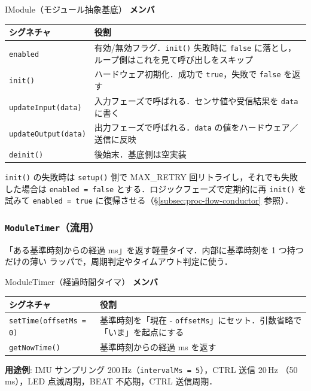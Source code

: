\documentclass[lualatex,book,paper=a4paper,jafontsize=11.5pt,jafontscale=1.05]{jlreq}
\begin{document}
\begin{apibox}{IModule（モジュール抽象基底）}
\textbf{メンバ}\\[2pt]
\begin{tabular}{l p{}}
\toprule
\textbf{シグネチャ} & \textbf{役割} \\
\midrule
\texttt{enabled}              & 有効/無効フラグ．\texttt{init()} 失敗時に \texttt{false} に落とし，ループ側はこれを見て呼び出しをスキップ \\
\texttt{init()}               & ハードウェア初期化．成功で \texttt{true}，失敗で \texttt{false} を返す \\
\texttt{updateInput(data)}    & 入力フェーズで呼ばれる．センサ値や受信結果を \texttt{data} に書く \\
\texttt{updateOutput(data)}   & 出力フェーズで呼ばれる．\texttt{data} の値をハードウェア／送信に反映 \\
\texttt{deinit()}             & 後始末．基底側は空実装 \\
\bottomrule
\end{tabular}
\end{apibox}

\texttt{init()} の失敗時は \texttt{setup()} 側で MAX\_RETRY 回リトライし，それでも失敗
した場合は \texttt{enabled = false} とする．ロジックフェーズで定期的に再 \texttt{init()}
を試みて \texttt{enabled = true} に復帰させる（\S\ref{subsec:proc-flow-conductor} 参照）．

\subsubsection{\texttt{ModuleTimer}（流用）}

「ある基準時刻からの経過 ms」を返す軽量タイマ．内部に基準時刻を 1 つ持つだけの薄い
ラッパで，周期判定やタイムアウト判定に使う．

\begin{apibox}{ModuleTimer（経過時間タイマ）}
\textbf{メンバ}\\[2pt]
\begin{tabular}{l p{}}
\toprule
\textbf{シグネチャ} & \textbf{役割} \\
\midrule
\texttt{setTime(offsetMs = 0)} & 基準時刻を「現在 - \texttt{offsetMs}」にセット．引数省略で「いま」を起点にする \\
\texttt{getNowTime()}          & 基準時刻からの経過 ms を返す \\
\bottomrule
\end{tabular}

\medskip
\textbf{用途例}: IMU サンプリング 200\,Hz（\texttt{intervalMs = 5}），CTRL 送信 20\,Hz
（50\,ms），LED 点滅周期，BEAT 不応期，CTRL 送信周期．
\end{apibox}
\end{document}
